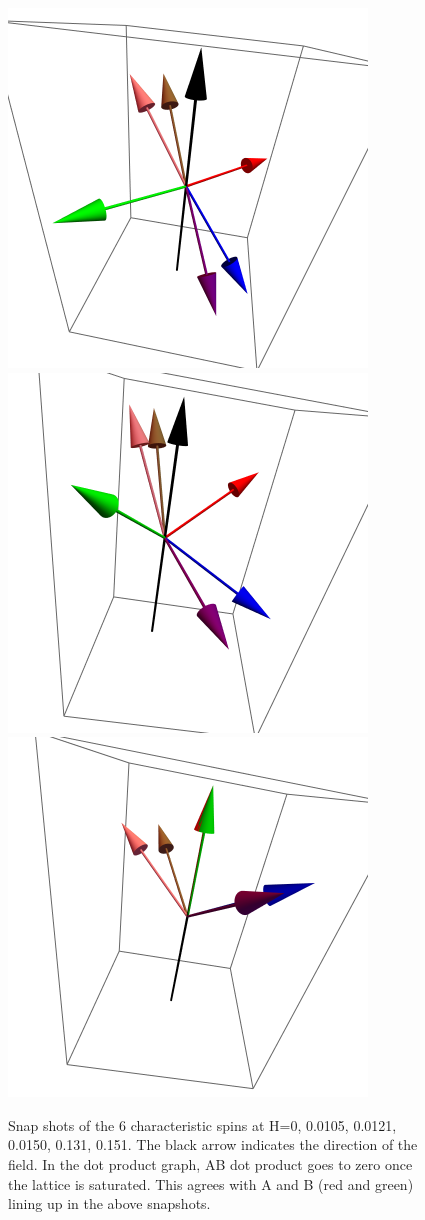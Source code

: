 \documentclass{article}
\begin{document}
\begin{figure}[ht]
\includegraphics[scale=0.3]{HVariedData/Pictures/001Inc151.png}
\includegraphics[scale=0.3]{HVariedData/Pictures/001Inc30S.png}
\includegraphics[scale=0.3]{HVariedData/Pictures/001Inc35S.png}
\caption{Snap shots of the 6 characteristic spins at H=0, 0.0105, 0.0121, 0.0150, 0.131, 0.151. The black arrow
indicates the direction of the field. In the dot product graph, AB dot product goes to zero once the lattice 
is saturated. This agrees with A and B (red and green) lining up in the above snapshots.}
\end{figure}
\clearpage
\end{document}
